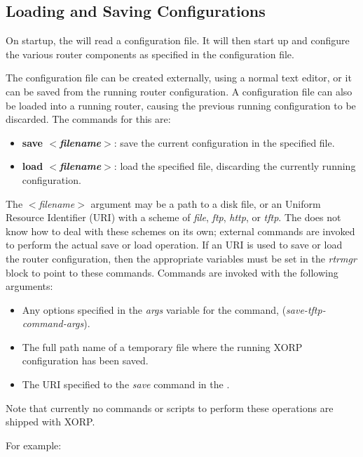 \subsection{Loading and Saving Configurations}

On startup, the \rtrmgr will read a configuration file.  It will then
start up and configure the various router components as specified in
the configuration file.

The configuration file can be created externally, using a normal text
editor, or it can be saved from the running router configuration.  A
configuration file can also be loaded into a running router, causing
the previous running configuration to be discarded.  The commands for
this are:
\begin{itemize}
\item \textbf{save $<$\textit{filename}$>$}: save the current
configuration in the specified file.
\item \textbf{load $<$\textit{filename}$>$}: load the specified file,
discarding the currently running configuration.
\end{itemize}

The $<$\textit{filename}$>$ argument may be a path to a disk file,
or an Uniform Resource Identifier (URI) with a scheme of \emph{file},
\emph{ftp}, \emph{http}, or \emph{tftp}.
The \rtrmgr does not know how
to deal with these schemes on its own; external commands are invoked
to perform the actual save or load operation. If an URI is used to save
or load the router configuration, then the appropriate variables must be
set in the \emph{rtrmgr} block to point to these commands.
Commands are invoked with the following arguments:
\begin{itemize}
\item Any options specified in the \emph{args} variable for the command,
(\eg \emph{save-tftp-command-args}).
\item The full path name of a temporary file where the running XORP
configuration has been saved.
\item The URI specified to the \emph{save} command in the \xorpsh.
\end{itemize}
Note that currently no commands or scripts to perform these operations
are shipped with XORP.

For example:
\vspace{0.1in}

\noindent{}

